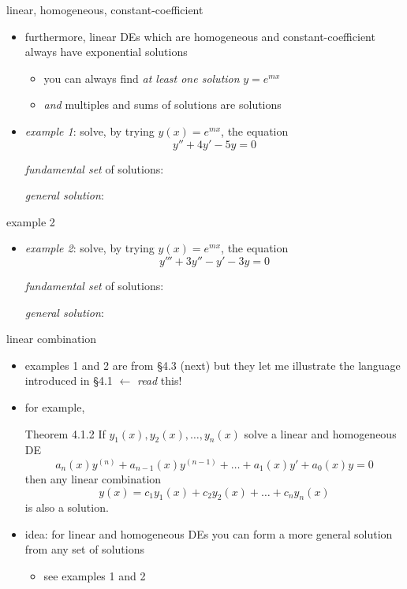 \documentclass{beamer}
\begin{document}
\begin{frame}{linear, homogeneous, constant-coefficient}

\begin{itemize}
\item furthermore, linear DEs which are \alert{homogeneous and constant-coefficient always have exponential solutions}
    \begin{itemize}
    \item you can always find \emph{at least one solution} $y=e^{mx}$
    \item \emph{and} multiples and sums of solutions are solutions
    \end{itemize}
\item \emph{example 1}: solve, by trying $y(x)=e^{mx}$, the equation
    $$y'' + 4 y' - 5 y = 0$$

\vspace{30mm}
\small
\noindent \emph{fundamental set} of solutions:

\medskip
\noindent \emph{general solution}:
\end{itemize}
\end{frame}


\begin{frame}{example 2}

\begin{itemize}
\item \emph{example 2}: solve, by trying $y(x)=e^{mx}$, the equation
    $$y''' + 3 y'' - y' - 3 y = 0$$

\vspace{40mm}
\small
\noindent \emph{fundamental set} of solutions:

\medskip
\noindent \emph{general solution}:
\end{itemize}
\end{frame}


\begin{frame}{linear combination}

\begin{itemize}
\item examples 1 and 2 are from \S 4.3 (\alert{next}) but they let me illustrate the language introduced in \S 4.1 \alert{$\longleftarrow$ \emph{read} this!}
\item for example,
\begin{block}{Theorem 4.1.2}
If $y_1(x), y_2(x), \dots, y_n(x)$ solve a linear and homogeneous DE
\begin{equation*}
    a_n(x) y^{(n)} + a_{n-1}(x) y^{(n-1)} + \dots + a_1(x) y' + a_0(x) y = 0
\end{equation*}
then any linear combination
    $$y(x) = c_1 y_1(x) + c_2 y_2(x) + \dots + c_n y_n(x)$$
is also a solution.
\end{block}

\item idea: for linear and homogeneous DEs you can form a more general solution from any set of solutions
    \begin{itemize}
    \item see examples 1 and 2
    \end{itemize}        
\end{itemize}
\end{frame}
\end{document}
